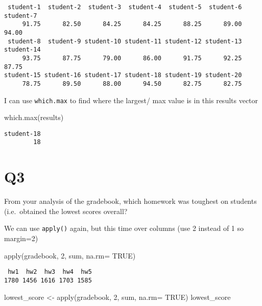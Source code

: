 \documentclass[
  letterpaper,
  DIV=11,
  numbers=noendperiod]{scrartcl}
\newenvironment{Shaded}{\begin{snugshade}}{\end{snugshade}}
\newcommand{\AttributeTok}[1]{\textcolor[rgb]{0.40,0.45,0.13}{#1}}
\newcommand{\ConstantTok}[1]{\textcolor[rgb]{0.56,0.35,0.01}{#1}}
\newcommand{\DecValTok}[1]{\textcolor[rgb]{0.68,0.00,0.00}{#1}}
\newcommand{\FunctionTok}[1]{\textcolor[rgb]{0.28,0.35,0.67}{#1}}
\newcommand{\NormalTok}[1]{\textcolor[rgb]{0.00,0.23,0.31}{#1}}
\newcommand{\OtherTok}[1]{\textcolor[rgb]{0.00,0.23,0.31}{#1}}
\begin{document}
\begin{verbatim}
 student-1  student-2  student-3  student-4  student-5  student-6  student-7 
     91.75      82.50      84.25      84.25      88.25      89.00      94.00 
 student-8  student-9 student-10 student-11 student-12 student-13 student-14 
     93.75      87.75      79.00      86.00      91.75      92.25      87.75 
student-15 student-16 student-17 student-18 student-19 student-20 
     78.75      89.50      88.00      94.50      82.75      82.75 
\end{verbatim}

I can use \texttt{which.max} to find where the largest/ max value is in
this results vector

\begin{Shaded}
\begin{Highlighting}[]
\FunctionTok{which.max}\NormalTok{(results)}
\end{Highlighting}
\end{Shaded}

\begin{verbatim}
student-18 
        18 
\end{verbatim}

\hypertarget{q3}{%
\section{\texorpdfstring{\textbf{Q3}}{Q3}}\label{q3}}

From your analysis of the gradebook, which homework was toughest on
students (i.e.~obtained the lowest scores overall?

We can use \texttt{apply()} again, but this time over columns (use 2
instead of 1 so margin=2)

\begin{Shaded}
\begin{Highlighting}[]
\FunctionTok{apply}\NormalTok{(gradebook, }\DecValTok{2}\NormalTok{, sum, }\AttributeTok{na.rm=} \ConstantTok{TRUE}\NormalTok{)}
\end{Highlighting}
\end{Shaded}

\begin{verbatim}
 hw1  hw2  hw3  hw4  hw5 
1780 1456 1616 1703 1585 
\end{verbatim}

\begin{Shaded}
\begin{Highlighting}[]
\NormalTok{lowest\_score }\OtherTok{\textless{}{-}} \FunctionTok{apply}\NormalTok{(gradebook, }\DecValTok{2}\NormalTok{, sum, }\AttributeTok{na.rm=} \ConstantTok{TRUE}\NormalTok{)}
\NormalTok{lowest\_score}
\end{Highlighting}
\end{Shaded}
\end{document}
